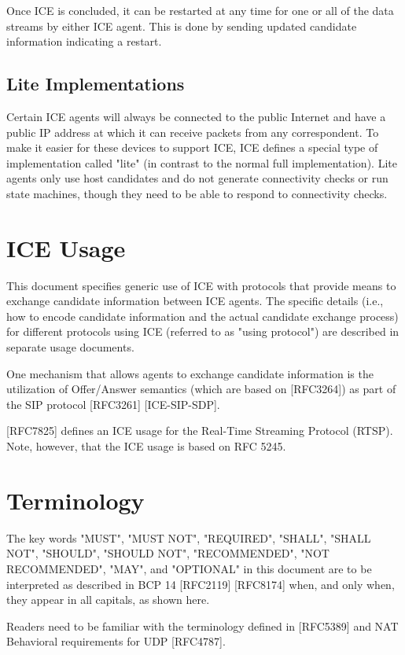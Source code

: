 \documentclass{article}
\begin{document}
Once ICE is concluded, it can be restarted at any time for one or all of the data streams by either ICE agent.  This is done by sending updated candidate information indicating a restart.

\subsection{Lite Implementations}

Certain ICE agents will always be connected to the public Internet and have a public IP address at which it can receive packets from any correspondent.  To make it easier for these devices to support ICE, ICE defines a special type of implementation called "lite" (in contrast to the normal full implementation).  Lite agents only use host candidates and do not generate connectivity checks or run state machines, though they need to be able to respond to connectivity checks.

\section{ICE Usage}

This document specifies generic use of ICE with protocols that provide means to exchange candidate information between ICE agents. The specific details (i.e., how to encode candidate information and the actual candidate exchange process) for different protocols using ICE (referred to as "using protocol") are described in separate usage documents.

One mechanism that allows agents to exchange candidate information is the utilization of Offer/Answer semantics (which are based on [RFC3264]) as part of the SIP protocol [RFC3261] [ICE-SIP-SDP].

[RFC7825] defines an ICE usage for the Real-Time Streaming Protocol (RTSP).  Note, however, that the ICE usage is based on RFC 5245.

\section{Terminology}

The key words "MUST", "MUST NOT", "REQUIRED", "SHALL", "SHALL NOT", "SHOULD", "SHOULD NOT", "RECOMMENDED", "NOT RECOMMENDED", "MAY", and "OPTIONAL" in this document are to be interpreted as described in BCP 14 [RFC2119] [RFC8174] when, and only when, they appear in all capitals, as shown here.

Readers need to be familiar with the terminology defined in [RFC5389] and NAT Behavioral requirements for UDP [RFC4787].
\end{document}
